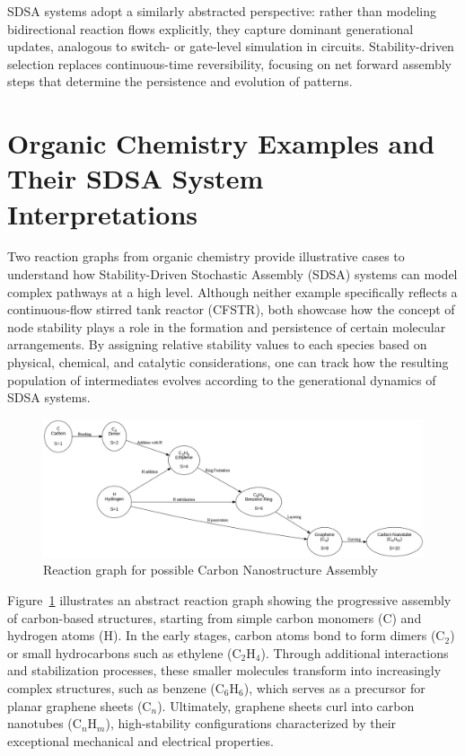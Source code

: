 \documentclass[preprint,12pt]{elsarticle}
\begin{document}
SDSA systems adopt a similarly abstracted perspective: rather than modeling bidirectional reaction flows explicitly, they capture dominant generational updates, analogous to switch- or gate-level simulation in circuits. Stability-driven selection replaces continuous-time reversibility, focusing on net forward assembly steps that determine the persistence and evolution of patterns.

\section{Organic Chemistry Examples and Their SDSA System Interpretations}
\label{sec:organic-ba-examples}

Two reaction graphs from organic chemistry provide illustrative cases to understand how Stability-Driven Stochastic Assembly (SDSA) systems can model complex pathways at a high level. Although neither example specifically reflects a continuous-flow stirred tank reactor (CFSTR), both showcase how the concept of node stability plays a role in the formation and persistence of certain molecular arrangements. By assigning relative stability values to each species based on physical, chemical, and catalytic considerations, one can track how the resulting population of intermediates evolves according to the generational dynamics of SDSA systems.

\begin{figure}[h]
    \centering
    \includegraphics[width=1\textwidth,height=0.55\textwidth]{figure_7.png}
    \caption{Reaction graph for possible Carbon Nanostructure Assembly}
    \label{fig:figure_7}
\end{figure}

Figure~\ref{fig:figure_7} illustrates an abstract reaction graph showing the progressive assembly of carbon-based structures, starting from simple carbon monomers (\( \text{C} \)) and hydrogen atoms (\( \text{H} \)). In the early stages, carbon atoms bond to form dimers (\( \text{C}_2 \)) or small hydrocarbons such as ethylene (\( \text{C}_2\text{H}_4 \)). Through additional interactions and stabilization processes, these smaller molecules transform into increasingly complex structures, such as benzene (\( \text{C}_6\text{H}_6 \)), which serves as a precursor for planar graphene sheets (\( \text{C}_n \)). Ultimately, graphene sheets curl into carbon nanotubes (\( \text{C}_n\text{H}_m \)), high-stability configurations characterized by their exceptional mechanical and electrical properties. 
\end{document}
